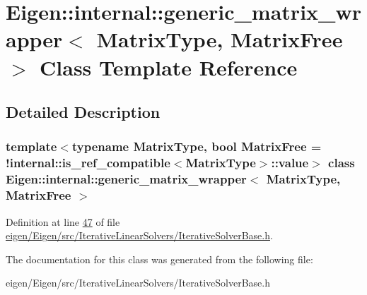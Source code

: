 \hypertarget{class_eigen_1_1internal_1_1generic__matrix__wrapper}{}\section{Eigen\+:\+:internal\+:\+:generic\+\_\+matrix\+\_\+wrapper$<$ Matrix\+Type, Matrix\+Free $>$ Class Template Reference}
\label{class_eigen_1_1internal_1_1generic__matrix__wrapper}


\subsection{Detailed Description}
\subsubsection*{template$<$typename Matrix\+Type, bool Matrix\+Free = !internal\+::is\+\_\+ref\+\_\+compatible$<$\+Matrix\+Type$>$\+::value$>$\newline
class Eigen\+::internal\+::generic\+\_\+matrix\+\_\+wrapper$<$ Matrix\+Type, Matrix\+Free $>$}



Definition at line \hyperlink{eigen_2_eigen_2src_2_iterative_linear_solvers_2_iterative_solver_base_8h_source_l00047}{47} of file \hyperlink{eigen_2_eigen_2src_2_iterative_linear_solvers_2_iterative_solver_base_8h_source}{eigen/\+Eigen/src/\+Iterative\+Linear\+Solvers/\+Iterative\+Solver\+Base.\+h}.



The documentation for this class was generated from the following file\+:\begin{DoxyCompactItemize}
\item 
eigen/\+Eigen/src/\+Iterative\+Linear\+Solvers/\+Iterative\+Solver\+Base.\+h\end{DoxyCompactItemize}
